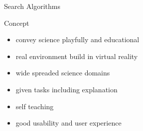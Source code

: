 \documentclass[final,hyperref={pdfpagelabels=false}]{beamer}
\begin{document}
\begin{frame}[t]
\begin{columns}[t]
\begin{column}{.465\textwidth}
\begin{block}{Search Algorithms}
\begin{figure}
	\end{figure}
\end{block}

\vspace{0.3cm}

\begin{block}{Concept}
	
		\vspace{30px}
	
	\begin{itemize}
		\item convey science playfully and educational
		\vspace{10px}
		\item real environment build in virtual reality
				\vspace{10px}
		\item wide spreaded science domains
				\vspace{10px}
		\item given tasks including explanation
				\vspace{10px}
		\item self teaching
				\vspace{10px}
		\item good usability and user experience
				\vspace{10px}
	\end{itemize}

\vspace{30px}

\end{block}

\vspace{0.1cm}

\end{column} %

\begin{column}{.015\textwidth}\end{column} %

\end{columns} %

\end{frame} %
\end{document}
